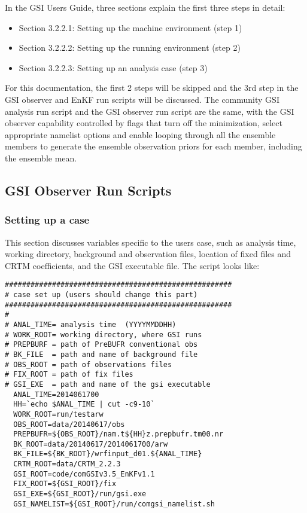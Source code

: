 In the GSI User\textquotesingle s Guide, three sections explain the first three steps in detail:
\begin{itemize}
\item Section 3.2.2.1: Setting up the machine environment (step 1)
\item Section 3.2.2.2: Setting up the running environment (step 2)
\item Section 3.2.2.3: Setting up an analysis case (step 3)
\end{itemize}

For this documentation, the first 2 steps will be skipped and the 3rd step in the GSI observer 
and EnKF run scripts will be discussed. The community GSI analysis run script and the GSI 
observer run script are the same, with the GSI observer capability controlled by flags 
that turn off the minimization, select appropriate namelist options and enable looping through 
all the ensemble members to generate the ensemble observation priors for each member, 
including the ensemble mean.
   
\subsection{GSI Observer Run Scripts}

      \subsubsection{Setting up a case}
      This section discusses variables specific to the user\textquotesingle s case, such as analysis time, working directory, background and observation files, location of fixed files and CRTM coefficients, and the GSI executable file. The script looks like:
\begin{scriptsize}
 \begin{verbatim}
##################################################### 
# case set up (users should change this part) 
##################################################### 
#
# ANAL_TIME= analysis time  (YYYYMMDDHH)
# WORK_ROOT= working directory, where GSI runs
# PREPBURF = path of PreBUFR conventional obs
# BK_FILE  = path and name of background file
# OBS_ROOT = path of observations files
# FIX_ROOT = path of fix files
# GSI_EXE  = path and name of the gsi executable
  ANAL_TIME=2014061700
  HH=`echo $ANAL_TIME | cut -c9-10`
  WORK_ROOT=run/testarw
  OBS_ROOT=data/20140617/obs
  PREPBUFR=${OBS_ROOT}/nam.t${HH}z.prepbufr.tm00.nr
  BK_ROOT=data/20140617/2014061700/arw
  BK_FILE=${BK_ROOT}/wrfinput_d01.${ANAL_TIME}
  CRTM_ROOT=data/CRTM_2.2.3
  GSI_ROOT=code/comGSIv3.5_EnKFv1.1
  FIX_ROOT=${GSI_ROOT}/fix
  GSI_EXE=${GSI_ROOT}/run/gsi.exe
  GSI_NAMELIST=${GSI_ROOT}/run/comgsi_namelist.sh
\end{verbatim}
\end{scriptsize}

